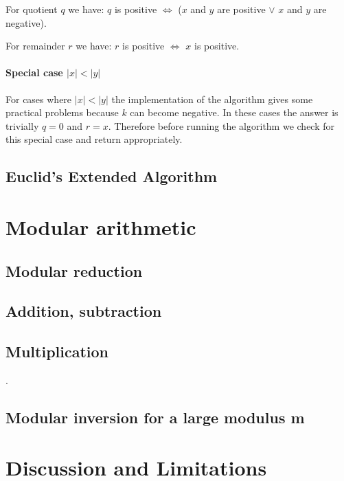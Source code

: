 \documentclass[a4paper]{article}
\begin{document}
For quotient $q$ we have: $q$ is positive $\iff$ ($x$ and $y$ are positive $\lor$ $x$ and $y$ are negative).

For remainder $r$ we have: $r$ is positive $\iff$ $x$ is positive.

\paragraph{Special case $|x|<|y|$}

For cases where $|x|<|y|$ the implementation of the algorithm gives some practical problems because $k$ can become negative.
In these cases the answer is trivially $q=0$ and $r=x$.
Therefore before running the algorithm we check for this special case and return appropriately.


\subsection{Euclid’s Extended Algorithm}


\section{Modular arithmetic}

\subsection{Modular reduction}

\subsection{Addition, subtraction}

\subsection{Multiplication}

\cite{shoup}.

\subsection{Modular inversion for a large modulus m}

\section{Discussion and Limitations}

\end{document}
